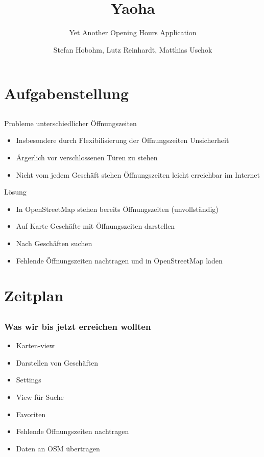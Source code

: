\documentclass[hyperref]{beamer}
\title{Yaoha}
\subtitle{Yet Another Opening Hours Application}
\author[Hobohm, Reinhardt, Uschok]{Stefan Hobohm, Lutz Reinhardt, Matthias Uschok}
\institute[TU Braunschweig, IBR]{Technische Universität Braunschweig, IBR}
\begin{document}
\frame[plain]{\titlepage}


\section{Aufgabenstellung}
\subsection{}

\begin{frame}{Probleme unterschiedlicher Öffnungszeiten}
\begin{itemize}
\item Insbesondere durch Flexibilisierung der Öffnungszeiten Unsicherheit
\item Ärgerlich vor verschlossenen Türen zu stehen
\item Nicht vom jedem Geschäft stehen Öffnungszeiten leicht erreichbar im Internet
\end{itemize}
\end{frame}

\begin{frame}{Lösung}
\begin{itemize}
\item In OpenStreetMap stehen bereits Öffnungszeiten (unvollständig)
\item Auf Karte Geschäfte mit Öffnungszeiten darstellen
\item Nach Geschäften suchen
\item Fehlende Öffnungszeiten nachtragen und in OpenStreetMap laden
\end{itemize}
\end{frame}

\section{Zeitplan}
\subsection{}


\begin{frame}
  \frametitle{Was wir bis jetzt erreichen wollten}
  \begin{itemize}
  	\item Karten-view
    \item Darstellen von Geschäften
    \item Settings
    \item View für Suche
    \item Favoriten
    \item Fehlende Öffnungszeiten nachtragen
    \item Daten an OSM übertragen
  \end{itemize}
\end{frame}
\end{document}
